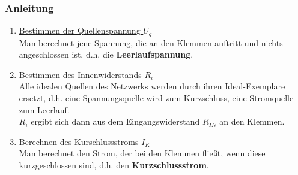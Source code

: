 \subsubsection*{Anleitung}
\begin{enumerate}
    \item \underline{Bestimmen der Quellenspannung $U_q$} \\
    Man berechnet jene Spannung, die an den Klemmen auftritt und nichts angeschlossen ist, d.h. die \textbf{Leerlaufspannung}.
    
    \item \underline{Bestimmen des Innenwiderstands $R_i$} \\
    Alle idealen Quellen des Netzwerks werden durch ihren Ideal-Exemplare ersetzt, d.h. eine Spannungsquelle wird zum Kurzschluss, eine Stromquelle zum Leerlauf. \\
    $R_i$ ergibt sich dann aus dem Eingangswiderstand $R_{IN}$ an den Klemmen.
    
    \item \underline{Berechnen des Kurschlussstroms $I_K$} \\
    Man berechnet den Strom, der bei den Klemmen fließt, wenn diese kurzgeschlossen sind, d.h. den \textbf{Kurzschlussstrom}.
\end{enumerate}

